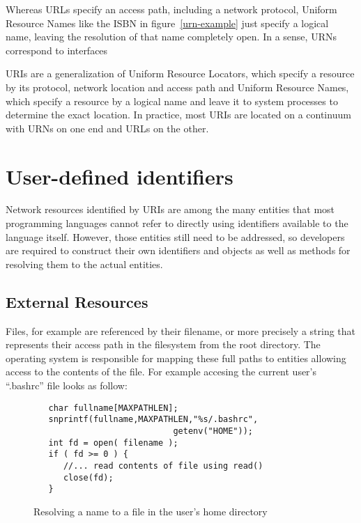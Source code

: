 \documentclass[preprint,authoryear]{acm_proc_article-sp}
\begin{document}
Whereas URLs specify an access path, including a network protocol, Uniform 
Resource Names like the ISBN in figure~\ref{urn-example} just specify a logical
name, leaving the resolution of that name completely open.  In a sense, URNs
correspond to interfaces 

URIs are a generalization of Uniform Resource Locators, which specify a
resource by its protocol, network location and access path and Uniform Resource Names,
which specify
a resource by a logical name and leave it to system processes to 
determine the exact location.  In practice, most URIs are located on
a continuum with URNs on one end and URLs on the other.

\section{User-defined identifiers}

Network resources identified by URIs are among the many entities that most
programming languages cannot refer to directly using identifiers available to the
language itself.
However, those entities still need to be addressed, so developers are required
to construct their own identifiers  and objects as well as methods for resolving them to the actual
entities.

\subsection{External Resources}

Files, for example are referenced by their filename, or more precisely
a string that represents their access path in the filesystem from the root 
directory.   The operating system is responsible for mapping these full
paths to entities allowing access to the contents of the file.  For example accesing
the current user's ``.bashrc'' file looks as follow:

\begin{figure}[htbp]
\begin{center}
\begin{small}
\begin{verbatim}
   char fullname[MAXPATHLEN];
   snprintf(fullname,MAXPATHLEN,"%s/.bashrc",
                            getenv("HOME"));
   int fd = open( filename );
   if ( fd >= 0 ) { 
      //... read contents of file using read()
      close(fd);
   }
\end{verbatim}
\end{small}
\caption{Resolving a name to a file in the user's home directory}
\label{posix-file-resolve}
\end{center}
\end{figure}
\end{document}
